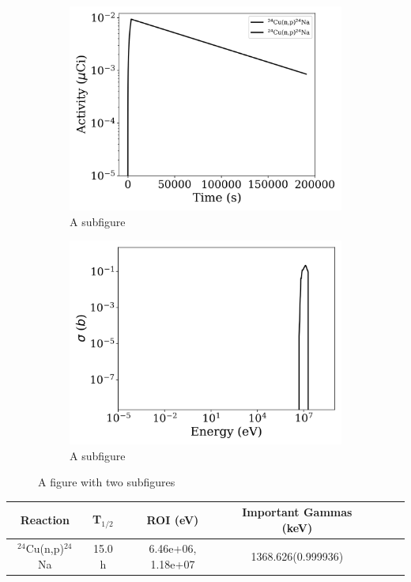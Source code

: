 \begin{figure}[h]
\centering
\begin{subfigure}{.5\textwidth}
  \centering
     \includegraphics[width=.8\textwidth]{plot/Cu-24(n,p)Na-24_wisconsin1} 

  \caption{A subfigure}
  \label{fig:sub1}
\end{subfigure}%
\begin{subfigure}{.5\textwidth}
  \centering
     \includegraphics[width=.8\textwidth]{plot/Cu-24(n,p)Na-24} 

  \caption{A subfigure}
  \label{fig:sub2}
\end{subfigure}
\caption{A figure with two subfigures}
\label{fig:test}
\end{figure}

\begin{table}[h]
\centering
\begin{tabular}{ |c|c|c|c|c|c|c| }
 \hline
 Reaction & T$_{1/2}$ & ROI (eV) & Important Gammas (keV) \\
 \hline 
 $^{24}$Cu(n,p)$^{24}$Na & 15.0 h & 6.46e+06, 1.18e+07 & 1368.626(0.999936) \\ 
\hline
\end{tabular}
\end{table}
